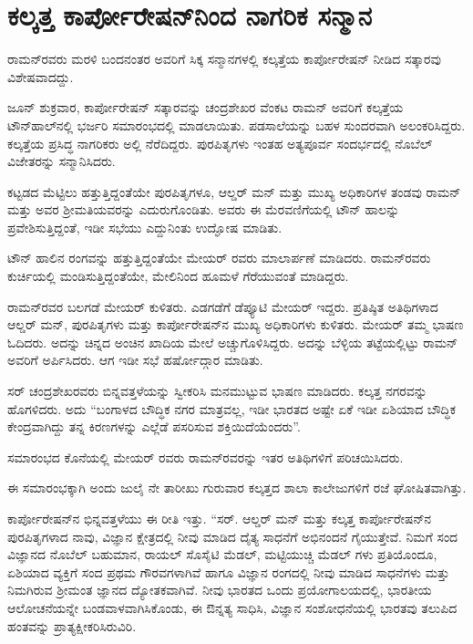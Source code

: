 \newpage

\section{ಕಲ್ಕತ್ತ ಕಾರ್ಪೋರೇಷನ್‍ನಿಂದ ನಾಗರಿಕ ಸನ್ಮಾನ}

ರಾಮನ್‍ರವರು ಮರಳಿ ಬಂದನಂತರ ಅವರಿಗೆ ಸಿಕ್ಕ ಸನ್ಮಾನಗಳಲ್ಲಿ ಕಲ್ಕತ್ತೆಯ ಕಾರ್ಪೋರೇಷನ್ ನೀಡಿದ ಸತ್ಕಾರವು ವಿಶೇಷವಾದದ್ದು.

ಜೂನ್  ಶುಕ್ರವಾರ, ಕಾರ್ಪೋರೇಷನ್ ಸತ್ಕಾರವನ್ನು ಚಂದ್ರಶೇಖರ ವೆಂಕಟ ರಾಮನ್ ಅವರಿಗೆ ಕಲ್ಕತ್ತೆಯ ಟೌನ್‍ಹಾಲ್‍ನಲ್ಲಿ ಭರ್ಜರಿ ಸಮಾರಂಭದಲ್ಲಿ ಮಾಡಲಾಯಿತು. ಪಡಸಾಲೆಯನ್ನು ಬಹಳ ಸುಂದರವಾಗಿ ಅಲಂಕರಿಸಿದ್ದರು. ಕಲ್ಕತ್ತೆಯ ಪ್ರಸಿದ್ಧ ನಾಗರಿಕರು ಅಲ್ಲಿ ನೆರೆದಿದ್ದರು. ಪುರಪಿತೃಗಳು ಇಂತಹ ಅತ್ಯಪೂರ್ವ ಸಂದರ್ಭದಲ್ಲಿ ನೊಬೆಲ್ ವಿಜೇತರನ್ನು ಸನ್ಮಾನಿಸಿದರು.

ಕಟ್ಟಡದ ಮೆಟ್ಟಿಲು ಹತ್ತುತ್ತಿದ್ದಂತೆಯೇ ಪುರಪಿತೃಗಳೂ, ಆಲ್ಡರ್ ಮನ್ ಮತ್ತು ಮುಖ್ಯ ಅಧಿಕಾರಿಗಳ ತಂಡವು ರಾಮನ್ ಮತ್ತು ಅವರ ಶ‍್ರೀಮತಿಯವರನ್ನು ಎದುರುಗೊಂಡಿತು. ಅವರು ಈ ಮೆರವಣಿಗೆಯಲ್ಲಿ ಟೌನ್ ಹಾಲನ್ನು ಪ್ರವೇಶಿಸುತ್ತಿದ್ದಂತೆ, ಇಡೀ ಸಭೆಯು ಎದ್ದುನಿಂತು ಉದ್ಘೋಷ ಮಾಡಿತು.

ಟೌನ್ ಹಾಲಿನ ರಂಗವನ್ನು ಹತ್ತುತ್ತಿದ್ದಂತೆಯೇ ಮೇಯರ್ ರವರು ಮಾಲಾರ್ಪಣೆ ಮಾಡಿದರು. ರಾಮನ್‍ರವರು ಕುರ್ಚಿಯಲ್ಲಿ ಮಂಡಿಸುತ್ತಿದ್ದಂತೆಯೇ, ಮೇಲಿನಿಂದ ಹೂಮಳೆ ಗೆರೆಯುವಂತೆ ಮಾಡಿದ್ದರು.

ರಾಮನ್‍ರವರ ಬಲಗಡೆ ಮೇಯರ್ ಕುಳಿತರು. ಎಡಗಡೆಗೆ ಡೆಪ್ಯೂಟಿ ಮೇಯರ್ ಇದ್ದರು. ಪ್ರತಿಷ್ಠಿತ ಅತಿಥಿಗಳಾದ ಆಲ್ಡರ್ ಮನ್, ಪುರಪಿತೃಗಳು ಮತ್ತು ಕಾರ್ಪೋರೇಷನ್‍ನ ಮುಖ್ಯ ಅಧಿಕಾರಿಗಳು ಕುಳಿತರು. ಮೇಯರ್ ತಮ್ಮ ಭಾಷಣ ಓದಿದರು. ಅದನ್ನು ಚಿನ್ನದ ಅಂಚಿನ ಖಾದಿಯ ಮೇಲೆ ಅಚ್ಚುಗೊಳಿಸಿದ್ದರು. ಅದನ್ನು ಬೆಳ್ಳಿಯ ತಟ್ಟೆಯಲ್ಲಿಟ್ಟು ರಾಮನ್ ಅವರಿಗೆ ಅರ್ಪಿಸಿದರು. ಆಗ ಇಡೀ ಸಭೆ ಹರ್ಷೋದ್ಗಾರ ಮಾಡಿತು.

ಸರ್ ಚಂದ್ರಶೇಖರವರು ಬಿನ್ನವತ್ತಳೆಯನ್ನು ಸ್ವೀಕರಿಸಿ ಮನಮುಟ್ಟುವ ಭಾಷಣ ಮಾಡಿದರು. ಕಲ್ಕತ್ತ ನಗರವನ್ನು ಹೊಗಳಿದರು. ಅದು “ಬಂಗಾಳದ ಬೌದ್ಧಿಕ ನಗರ ಮಾತ್ರವಲ್ಲ, ಇಡೀ ಭಾರತದ ಅಷ್ಟೇ ಏಕೆ ಇಡೀ ಏಶಿಯಾದ ಬೌದ್ಧಿಕ ಕೇಂದ್ರವಾಗಿದ್ದು ತನ್ನ ಕಿರಣಗಳನ್ನು ಎಲ್ಲೆಡೆ ಪಸರಿಸುವ ಶಕ್ತಿಯಿದೆಯೆಂದರು”.

ಸಮಾರಂಭದ ಕೊನೆಯಲ್ಲಿ ಮೇಯರ್ ರವರು ರಾಮನ್‍ರವರನ್ನು ಇತರ ಅತಿಥಿಗಳಿಗೆ ಪರಿಚಯಿಸಿದರು.

ಈ ಸಮಾರಂಭಕ್ಕಾಗಿ ಅಂದು ಜುಲೈ ನೇ ತಾರೀಖು ಗುರುವಾರ ಕಲ್ಕತ್ತದ ಶಾಲಾ ಕಾಲೇಜುಗಳಿಗೆ ರಜೆ ಘೋಷಿತವಾಗಿತ್ತು.

ಕಾರ್ಪೋರೇಷನ್‍ನ ಭಿನ್ನವತ್ತಳೆಯು ಈ ರೀತಿ ಇತ್ತು. “ಸರ್. ಆಲ್ಡರ್ ಮನ್ ಮತ್ತು ಕಲ್ಕತ್ತ ಕಾರ್ಪೋರೇಷನ್‍ನ ಪುರಪಿತೃಗಳಾದ ನಾವು, ವಿಜ್ಞಾನ ಕ್ಷೇತ್ರದಲ್ಲಿ ನೀವು ಮಾಡಿದ ದೈತ್ಯ ಸಾಧನೆಗೆ ಅಭಿನಂದನೆ ಗೈಯುತ್ತೇವೆ. ನಿಮಗೆ ಸಂದ ವಿಜ್ಞಾನದ ನೊಬೆಲ್ ಬಹುಮಾನ, ರಾಯಲ್ ಸೊಸೈಟಿ ಮೆಡಲ್, ಮಟ್ಟಿಯುಚ್ಚಿ ಮೆಡಲ್ ಗಳು ಪ್ರತಿಯೊಂದೂ, ಏಶಿಯಾದ ವ್ಯಕ್ತಿಗೆ ಸಂದ ಪ್ರಥಮ ಗೌರವಗಳಾಗಿವೆ ಹಾಗೂ ವಿಜ್ಞಾನ ರಂಗದಲ್ಲಿ ನೀವು ಮಾಡಿದ ಸಾಧನೆಗಳು ಮತ್ತು ನಿಮಗಿರುವ ಶ‍್ರೀಮಂತ ಜ್ಞಾನದ ದ್ಯೋತಕವಾಗಿವೆ. ನೀವು ಭಾರತದ ಒಂದು ಪ್ರಯೋಗಾಲಯದಲ್ಲಿ, ಭಾರತೀಯ ಆಲೋಚನೆಯನ್ನೇ ಬಂಡವಾಳವಾಗಿಸಿಕೊಂಡು, ಈ ಔನ್ನತ್ಯ ಸಾಧಿಸಿ, ವಿಜ್ಞಾನ ಸಂಶೋಧನೆಯಲ್ಲಿ ಭಾರತವು ತಲುಪಿದ ಹಂತವನ್ನು ಪ್ರಾತ್ಯಕ್ಷೀಕರಿಸಿರುವಿರಿ.

